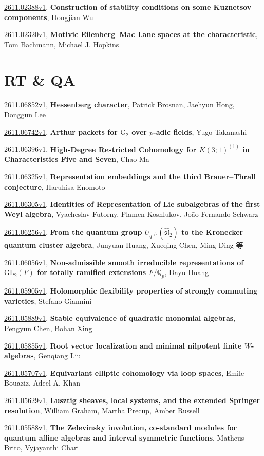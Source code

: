 \documentclass[9pt, a4paper]{article}
\theoremstyle{plain}
\theoremstyle{definition}
\theoremstyle{remark}
\newcommand{\arxiv}[3]{\href{https://arxiv.org/abs/#1}{#1}, \textbf{\textcolor{arxivblue}{#2}}, #3}
\begin{document}
\arxiv{2611.02388v1}{Construction of stability conditions on some Kuznetsov components}{Dongjian Wu}

\arxiv{2611.02320v1}{Motivic Eilenberg--Mac Lane spaces at the characteristic}{Tom Bachmann, Michael J. Hopkins}


\section{RT \& QA}
\arxiv{2611.06852v1}{Hessenberg character}{Patrick Brosnan, Jaehyun Hong, Donggun Lee}

\arxiv{2611.06742v1}{Arthur packets for $\mathrm{G}_2$ over $p$-adic fields}{Yugo Takanashi}

\arxiv{2611.06396v1}{High-Degree Restricted Cohomology for $K(3;1)^{(1)}$ in Characteristics Five and Seven}{Chao Ma}

\arxiv{2611.06325v1}{Representation embeddings and the third Brauer--Thrall conjecture}{Haruhisa Enomoto}

\arxiv{2611.06305v1}{Identities of Representation of Lie subalgebras of the first Weyl algebra}{Vyacheslav Futorny, Plamen Koshlukov, João Fernando Schwarz}

\arxiv{2611.06256v1}{From the quantum group $U_{q^{1/2}}( {\widehat {\mathfrak{sl}}}_2 )$ to the Kronecker quantum cluster algebra}{Junyuan Huang, Xueqing Chen, Ming Ding 等}

\arxiv{2611.06056v1}{Non-admissible smooth irreducible representations of $\mathrm{GL}_2(F)$ for totally ramified extensions $F/\mathbb{Q}_p$}{Dayu Huang}

\arxiv{2611.05905v1}{Holomorphic flexibility properties of strongly commuting varieties}{Stefano Giannini}

\arxiv{2611.05889v1}{Stable equivalence of quadratic monomial algebras}{Pengyun Chen, Bohan Xing}

\arxiv{2611.05855v1}{Root vector localization and minimal nilpotent finite $W$-algebras}{Genqiang Liu}

\arxiv{2611.05707v1}{Equivariant elliptic cohomology via loop spaces}{Emile Bouaziz, Adeel A. Khan}

\arxiv{2611.05629v1}{Lusztig sheaves, local systems, and the extended Springer resolution}{William Graham, Martha Precup, Amber Russell}

\arxiv{2611.05588v1}{The Zelevinsky involution, co-standard modules for quantum affine algebras and interval symmetric functions}{Matheus Brito, Vyjayanthi Chari}
\end{document}
